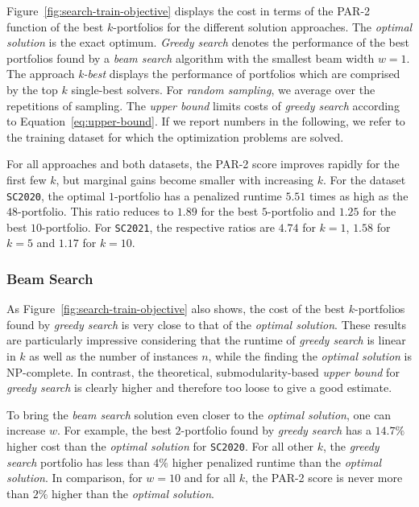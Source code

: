 \documentclass[conference]{IEEEtran}
\begin{document}
Figure~\ref{fig:search-train-objective} displays the cost in terms of the PAR-2 function of the best $k$-portfolios for the different solution approaches. 
The \emph{optimal solution} is the exact optimum.
\emph{Greedy search} denotes the performance of the best portfolios found by a \emph{beam search} algorithm with the smallest beam width $w=1$. 
The approach \emph{k-best} displays the performance of portfolios which are comprised by the top $k$ single-best solvers. 
For \emph{random sampling}, we average over the repetitions of sampling.
The \emph{upper bound} limits costs of \emph{greedy search} according to Equation~\ref{eq:upper-bound}.
If we report numbers in the following, we refer to the training dataset for which the optimization problems are solved.

For all approaches and both datasets, the PAR-2 score improves rapidly for the first few $k$, but marginal gains become smaller with increasing $k$.
For the dataset \texttt{SC2020}, the optimal $1$-portfolio has a penalized runtime $5.51$ times as high as the $48$-portfolio.
This ratio reduces to $1.89$ for the best $5$-portfolio and $1.25$ for the best $10$-portfolio.
For \texttt{SC2021}, the respective ratios are $4.74$ for $k=1$, $1.58$ for $k=5$ and $1.17$ for $k=10$.

\subsubsection{Beam Search}

As Figure~\ref{fig:search-train-objective} also shows, the cost of the best $k$-portfolios found by \emph{greedy search} is very close to that of the \emph{optimal solution}.
These results are particularly impressive considering that the runtime of \emph{greedy search} is linear in $k$ as well as the number of instances $n$, while the finding the \emph{optimal solution} is NP-complete.
In contrast, the theoretical, submodularity-based \emph{upper bound} for \emph{greedy search} is clearly higher and therefore too loose to give a good estimate.

To bring the \emph{beam search} solution even closer to the \emph{optimal solution}, one can increase $w$.
For example, the best $2$-portfolio found by \emph{greedy search} has a $14.7\%$ higher cost than the \emph{optimal solution} for \texttt{SC2020}.
For all other $k$, the \emph{greedy search} portfolio has less than $4\%$ higher penalized runtime than the \emph{optimal solution}.
In comparison, for $w=10$ and for all $k$, the PAR-2 score is never more than $2\%$ higher than the \emph{optimal solution}.
\end{document}
